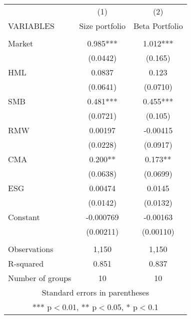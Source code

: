 \begin{tabular}{lcc} \hline
 & (1) & (2) \\
VARIABLES & Size portfolio & Beta Portfolio \\ \hline
 &  &  \\
Market & 0.985*** & 1.012*** \\
 & (0.0442) & (0.165) \\
HML & 0.0837 & 0.123 \\
 & (0.0641) & (0.0710) \\
SMB & 0.481*** & 0.455*** \\
 & (0.0721) & (0.105) \\
RMW & 0.00197 & -0.00415 \\
 & (0.0228) & (0.0917) \\
CMA & 0.200** & 0.173** \\
 & (0.0638) & (0.0699) \\
ESG & 0.00474 & 0.0145 \\
 & (0.0142) & (0.0132) \\
Constant & -0.000769 & -0.00163 \\
 & (0.00211) & (0.00110) \\
 &  &  \\
Observations & 1,150 & 1,150 \\
R-squared & 0.851 & 0.837 \\
 Number of groups & 10 & 10 \\ \hline
\multicolumn{3}{c}{ Standard errors in parentheses} \\
\multicolumn{3}{c}{ *** p$<$0.01, ** p$<$0.05, * p$<$0.1} \\
\end{tabular}
